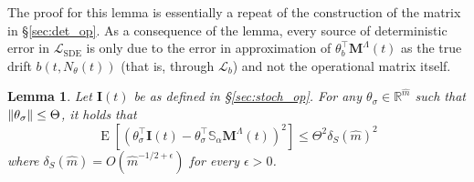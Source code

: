 \documentclass[11pt, a4paper]{article}
\theoremstyle{theoremstyle}
\newtheorem{lemma}[theorem]{Lemma}
\theoremstyle{definitionstyle}
\DeclareMathOperator{\EE}{\mathrm E}
\DeclarePairedDelimiter{\norm}{\lVert}{\rVert}
\begin{document}
The proof for this lemma is essentially a repeat of the construction of the matrix in \S\ref{sec:det_op}. As a consequence of the lemma, every source of deterministic error in \( \mathcal L_{\text{SDE}} \) is only due to the error in approximation of \( \theta_b^\top \mathbf M^\Lambda(t) \) as the true drift \( b(t, N_\theta(t)) \) (that is, through \( \mathcal L_b \)) and not the operational matrix itself.

\begin{lemma}\label{lem:3.2}
    Let \( \mathbf I(t) \) be as defined in \S\ref{sec:stoch_op}. For any \( \theta_\sigma \in \mathbb R^{\hat m} \) such that \( \norm{\theta_\sigma} \leq \Theta \), it holds that
    \begin{equation}
        \EE \left [ (\theta_\sigma^\top \mathbf I(t) - \theta_\sigma^\top \mathbb S_\alpha \mathbf M^\Lambda(t))^2 \right ] \leq \Theta^2 \delta_S(\hat m)^2
    \end{equation}
    where \( \delta_S(\hat m) = O(\hat m^{-1/2 + \epsilon}) \) for every \( \epsilon > 0 \).
\end{lemma}
\end{document}
